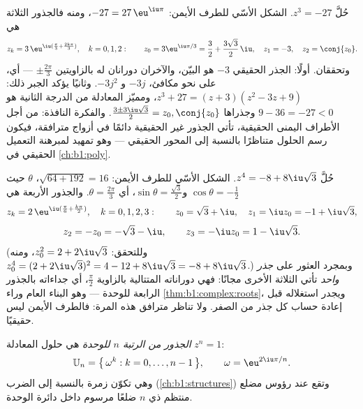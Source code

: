 \begin{example}\label{ex:b1:complex:cuberoots}
حُلَّ $z^3 = -27$. الشكل الأسّي للطرف الأيمن: $-27 =
27\,\eu^{\iu\pi}$، ومنه فالجذور الثلاثة هي
\[
z_k = 3\,\eu^{\iu(\frac\pi3 + \frac{2k\pi}3)}, \quad k = 0, 1, 2 :
\qquad
z_0 = 3\eu^{\iu\pi/3} = \frac32 + \frac{3\sqrt3}2\,\iu,
\quad
z_1 = -3,
\quad
z_2 = \conj{z_0} .
\]
وتحققان. أولًا: الجذر الحقيقي $-3$ هو البيّن، والآخران دورانان
له بالزاويتين $\pm\frac{2\pi}3$ --- أي، على نحو مكافئ،
$-3j$ و $-3j^2$. وثانيًا يؤكد الجبر ذلك: $z^3 + 27 = (z +
3)(z^2 - 3z + 9)$، ومميّز المعادلة من الدرجة الثانية هو $9 - 36 =
-27 < 0$ وجذراها $\frac{3 \pm 3\iu\sqrt3}2 = z_0, \conj{z_0}$.
والفكرة النافذة: من أجل الأطراف اليمنى الحقيقية، تأتي الجذور غير
الحقيقية دائمًا في أزواج مترافقة، فيكون رسم  الحلول
متناظرًا بالنسبة إلى المحور الحقيقي --- وهو تمهيد لمبرهنة
التعميل الحقيقي في \cref{ch:b1:poly}.
\end{example}

\begin{example}\label{ex:b1:complex:fourthroots}
حُلَّ $z^4 = -8 + 8\iu\sqrt3$. الشكل الأسّي للطرف الأيمن:
 $\sqrt{64 + 192} = 16$،  $\theta$ حيث
$\cos\theta = -\frac12$ و$\sin\theta = \frac{\sqrt3}2$، أي
$\theta = \frac{2\pi}3$. والجذور الأربعة هي
\[
z_k = 2\,\eu^{\iu(\frac\pi6 + \frac{k\pi}2)}, \quad k = 0, 1, 2,
3 :
\qquad
z_0 = \sqrt3 + \iu,\quad z_1 = \iu z_0 = -1 + \iu\sqrt3,
\]
\[
z_2 = -z_0 = -\sqrt3 - \iu,\qquad z_3 = -\iu z_0 = 1 - \iu\sqrt3 .
\]
(وللتحقق: $z_0^2 = 2 + 2\iu\sqrt3$، ومنه $z_0^4 = (2 +
2\iu\sqrt3)^2 = 4 - 12 + 8\iu\sqrt3 = -8 + 8\iu\sqrt3$.) وبمجرد
العثور على \emph{جذر واحد} تأتي الثلاثة الأخرى مجانًا: فهي
دوراناته المتتالية بالزاوية $\frac\pi2$، أي جداءاته بالجذور
الرابعة للوحدة --- وهو البناء العام وراء
\cref{thm:b1:complex:roots}، ويجدر استغلاله قبل إعادة حساب
كل جذر من الصفر. ولا تناظر مترافق هذه المرة: فالطرف الأيمن ليس
حقيقيًا.
\end{example}

\begin{definition}\label{def:b1:complex:unity}
\emph{الجذور من الرتبة $n$ للوحدة} هي
حلول المعادلة $z^n = 1$:
\[
\mathbb{U}_n = \bigl\{\, \omega^k : k = 0, \dots, n-1 \,\bigr\},
\qquad \omega = \eu^{2\iu\pi/n}.
\]
وهي تكوّن زمرة بالنسبة إلى الضرب (\cref{ch:b1:structures}) وتقع
عند رؤوس مضلع منتظم ذي $n$ ضلعًا مرسوم داخل دائرة الوحدة.
\end{definition}

